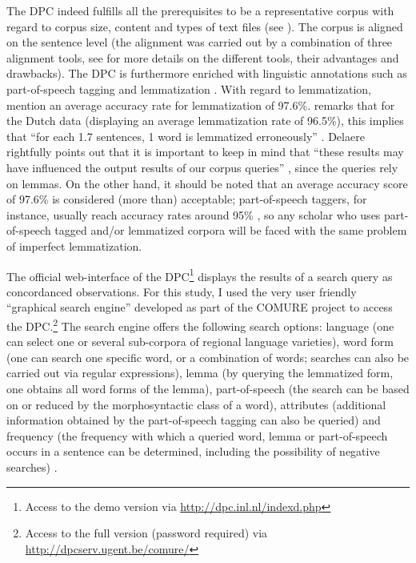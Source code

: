 The DPC indeed fulfills all the prerequisites to be a representative corpus with regard to corpus size, content and types of text files (see ). The corpus is aligned on the sentence level (the alignment was carried out by a combination of three alignment tools, see \citealt[190--191]{spyns_dutch_2013} for more details on the different tools, their advantages and drawbacks). The DPC is furthermore enriched with linguistic annotations such as part-of-speech tagging and lemmatization \citep[191]{spyns_dutch_2013}. With regard to lemmatization, \citet[384]{macken_dutch_2011} mention an average accuracy rate for lemmatization of 97.6\%. \citet[50]{delaere_translations_2015} remarks that for the Dutch data (displaying an average lemmatization rate of 96.5\%), this implies that “for each 1.7 sentences, 1 word is lemmatized erroneously” \citep[50]{delaere_translations_2015}. Delaere rightfully points out that it is important to keep in mind that “these results may have influenced the output results of our corpus queries” \citep[50]{delaere_translations_2015}, since the queries rely on lemmas. On the other hand, it should be noted that an average accuracy score of 97.6\% is considered (more than) acceptable; part-of-speech taggers, for instance, usually reach accuracy rates around 95\% \citep[383]{macken_dutch_2011}, so any scholar who uses part-of-speech tagged and\slash or lemmatized corpora will be faced with the same problem of imperfect lemmatization.

The official web-interface of the DPC\footnote{Access to the demo version via \url{http://dpc.inl.nl/indexd.php}} displays the results of a search query as concordanced observations. For this study, I used the very user friendly “graphical search engine” developed as part of the COMURE project to access the DPC.\footnote{Access to the full version (password required) via \url{http://dpcserv.ugent.be/comure/}} The search engine offers the following search options: language (one can select one or several sub-corpora of regional language varieties), word form (one can search one specific word, or a combination of words; searches can also be carried out via regular expressions), lemma (by querying the lemmatized form, one obtains all word forms of the lemma), part-of-speech (the search can be based on or reduced by the morphosyntactic class of a word), attributes (additional information obtained by the part-of-speech tagging can also be queried) and frequency (the frequency with which a queried word, lemma or part-of-speech occurs in a sentence can be determined, including the possibility of negative searches) \citep[62--65]{delaere_translations_2015}.

